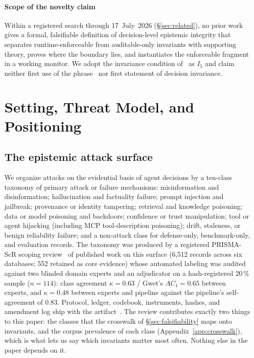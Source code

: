 \documentclass[conference,compsoc]{IEEEtran}
\theoremstyle{definition}
\theoremstyle{plain}
\newcommand{\Ifive}{\ensuremath{I_5}}
\begin{document}
\paragraph*{Scope of the novelty claim}
Within a registered search through 17~July~2026 (\S\ref{sec:related}),
no prior work gives a formal, falsifiable definition of decision-level
epistemic integrity that separates runtime-enforceable from
auditable-only invariants with supporting theory, proves where the
boundary lies, and instantiates the enforceable fragment in a working
monitor. We adopt the invariance condition of~\cite{qu} as \Ifive{} and
claim neither first use of the phrase~\cite{shen} nor first statement
of decision invariance.


\section{Setting, Threat Model, and Positioning}
\label{sec:setting}

\subsection{The epistemic attack surface}
\label{sec:taxonomy}
We organize attacks on the evidential basis of agent decisions by a
ten-class taxonomy of primary attack or failure mechanisms:
misinformation and disinformation; hallucination and factuality
failure; prompt injection and jailbreak; provenance or identity
tampering; retrieval and knowledge poisoning; data or model
poisoning and backdoors; confidence or trust manipulation; tool or
agent hijacking (including MCP tool-description poisoning); drift,
staleness, or benign reliability failure; and a non-attack class for
defense-only, benchmark-only, and evaluation records. The taxonomy was
produced by a registered PRISMA-ScR scoping review~\cite{prisma} of
published work on this surface (6,512 records across six databases;
552 retained as core evidence) whose automated labeling was audited
against two blinded domain experts and an adjudicator on a
hash-registered 20\,\% sample ($n{=}114$): class agreement $\kappa =
0.63$ / Gwet's $AC_1 = 0.65$ between experts, and $\kappa = 0.48$
between experts and pipeline against the pipeline's self-agreement of
0.83. Protocol, ledger, codebook, instruments, hashes, and amendment
log ship with the artifact~\cite{artifact}. The review contributes exactly two things to
this paper: the classes that the crosswalk of
\S\ref{sec:falsifiability} maps onto invariants, and the corpus
prevalence of each class (Appendix~\ref{app:crosswalk}), which is what lets
us say which invariants matter most often. Nothing else in the paper
depends on it.
\end{document}
